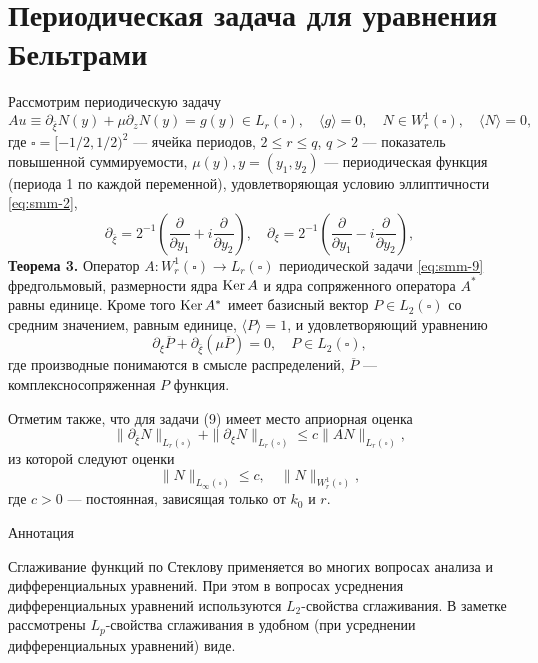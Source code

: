 \section{ Периодическая задача для уравнения Бельтрами}
Рассмотрим периодическую задачу
\begin{equation}\label{eq:smm-9}
Au\equiv\partial_{\bar{\xi}}N(y)+\mu\partial_z N(y)=g(y)\in L_r(\square) ,\quad  \langle g\rangle=0, \quad N\in W_r^1(\square), \quad \langle N\rangle=0,
\end{equation} 
	где $\square=[-1/2, 1/2)^2$ –-- ячейка периодов, $2\leqslant r\leqslant q$, $q>2$ –-- показатель повышенной суммируемости, $\mu(y),y=(y_1,y_2 )$ --- периодическая функция (периода 1 по каждой переменной), удовлетворяющая условию эллиптичности \eqref{eq:smm-2},
$$
\partial_{\bar{\xi}}=2^{-1}\left(\frac{\partial}{\partial y_1}+i\frac{\partial}{\partial y_2}\right),\quad \partial_{\xi}=2^{-1}\left(\frac{\partial}{\partial y_1}-i\frac{\partial}{\partial y_2}\right),
$$
\textbf{Теорема 3.} Оператор $A:W_r^1(\square)\to L_r(\square) $ периодической  задачи  \eqref{eq:smm-9}  фредгольмовый, размерности ядра  $\text{\rm Ker}\,A$  и ядра сопряженного оператора $A^\ast$ равны единице. Кроме того $\text{\rm Ker}\,A^\ast$ имеет базисный вектор $P\in L_2(\square)$ со средним значением, равным единице, $\langle P\rangle=1$, и удовлетворяющий уравнению
$$
\partial_\xi\overline{P}+\partial_{\bar\xi}(\mu\overline{P})=0,\quad P\in L_2(\square),                                
$$
где производные понимаются в смысле распределений, $\overline{P}$ --- комплексносопряженная $P$ функция.

Отметим также, что для задачи (9) имеет место априорная оценка 
$$
\|\partial_{\bar\xi} N\|_{L_r(\square) }+\|\partial_{\xi} N\|_{L_r(\square) }  \leqslant
c\|AN\|_{L_r(\square)},
$$   
из которой следуют оценки
$$
\|N\|_{L_\infty(\square)}\leqslant c, \quad \|N\|_{W_r^1(\square)},
$$         
где $c>0$ --- постоянная, зависящая только от $k_0$ и $r$.
\newpage
\begin{center} Аннотация
\end{center}
Сглаживание функций по Стеклову применяется во многих вопросах анализа и дифференциальных уравнений. При этом в вопросах усреднения дифференциальных уравнений используются $L_2$-свойства сглаживания. В заметке рассмотрены $L_p$-свойства сглаживания в удобном (при усреднении дифференциальных уравнений) виде.

	
